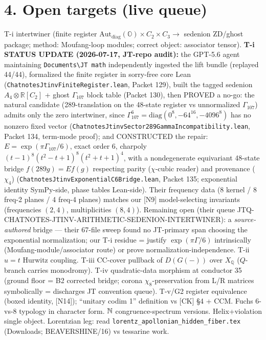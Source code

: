 \documentclass[10pt]{article}
\newcommand{\Q}{\mathbb Q}\newcommand{\R}{\mathbb R}\newcommand{\C}{\mathbb C}
\newcommand{\Ooct}{\mathbb O}
\begin{document}
\section*{4. Open targets (live queue)}
T-i intertwiner (finite register $\operatorname{Aut_{diag}}(\Ooct)\times C_2\times C_3\to$ sedenion ZD/ghost package; method: Moufang-loop modules; correct object: associator tensor). \textbf{T-i STATUS UPDATE (2026-07-17, JT-repo audit):} the GPT-5.6 agent maintaining \texttt{Documents\textbackslash JT math} independently ingested the lift bundle (replayed 44/44), formalized the finite register in sorry-free core Lean (\texttt{ChatnotesJtinvFiniteRegister.lean}, Packet 129), built the tagged sedenion $A_4\otimes\R[C_2]$ + ghost $\Gamma_{107}$ block table (Packet 130), then PROVED a no-go: the natural candidate (289-translation on the 48-state register vs unnormalized $\Gamma_{107}$) admits only the zero intertwiner, since $\Gamma_{107}^6=\mathrm{diag}(0^8,-64^{16},-4096^8)$ has no nonzero fixed vector (\texttt{ChatnotesJtinvSector289GammaIncompatibility.lean}, Packet 134, term-mode proof); and CONSTRUCTED the repair: $E=\exp(\pi\Gamma_{107}/6)$, exact order 6, charpoly $(t-1)^8(t^2-t+1)^8(t^2+t+1)^4$, with a nondegenerate equivariant 48-state bridge $f(289g)=Ef(g)$ respecting parity ($\chi$-cubic reader) and provenance ($\chi_4$) (\texttt{ChatnotesJtinvExponentialC6Bridge.lean}, Packet 135; exponential identity SymPy-side, phase tables Lean-side). Their frequency data (8 kernel / 8 freq-2 planes / 4 freq-4 planes) matches our [N9] model-selecting invariants (frequencies $(2,4)$, multiplicities $(8,4)$). Remaining open (their queue JTQ-CHATNOTES-JTINV-ARITHMETIC-SEDENION-INTERTWINER): a \emph{source-authored} bridge --- their 67-file sweep found no JT-primary span choosing the exponential normalization; our T-i residue = justify $\exp(\pi\Gamma/6)$ intrinsically (Moufang-module/associator route) or prove normalization-independence. T-ii $u=t$ Hurwitz coupling. T-iii CC-cover pullback of $D(G(-))$ over $X_\Q$ ($Q$-branch carries monodromy). T-iv quadratic-data morphism at conductor 35 (ground floor = B2 corrected bridge; corona $\chi_8$-preservation from L/R matrices symbolically = discharges JT convention queue). T-v/G2 register equivalence (boxed identity, [N14]); ``unitary codim 1'' definition vs [CK] \S4 + CCM. Fuchs 6-vs-8 typology in character form. $\mathbb N$ congruence-spectrum versions. Helix+violation single object. Lorentzian leg: read \texttt{lorentz\_apollonian\_hidden\_fiber.tex} (Downloads; BEAVERSHINE/16) vs tessarine work.
\end{document}
